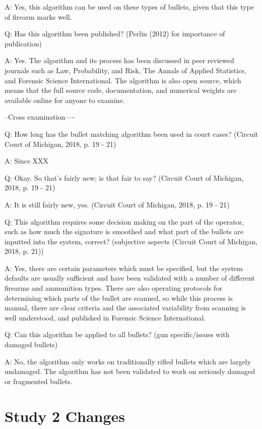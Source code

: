 \documentclass[print]{nuthesis}
\begin{document}
A: Yes, this algorithm can be used on these types of bullets, given that this type of firearm marks well.

Q: Has this algorithm been published? (Perlin (2012) for importance of publication)

A: Yes. The algorithm and its process has been discussed in peer reviewed journals such as Law, Probability, and Risk, The Annals of Applied Statistics, and Forensic Science International.
The algorithm is also open source, which means that the full source code, documentation, and numerical weights are available online for anyone to examine.

--Cross examination----

Q: How long has the bullet matching algorithm been used in court cases? (Circuit Court of Michigan, 2018, p. 19 - 21)

A: Since XXX

Q: Okay. So that's fairly new; is that fair to say? (Circuit Court of Michigan, 2018, p. 19 - 21)

A: It is still fairly new, yes. (Circuit Court of Michigan, 2018, p. 19 - 21)

Q: This algorithm requires some decision making on the part of the operator, such as how much the signature is smoothed and what part of the bullets are inputted into the system, correct? (subjective aspects (Circuit Court of Michigan, 2018, p. 21))

A: Yes, there are certain parameters which must be specified, but the system defaults are usually sufficient and have been validated with a number of different firearms and ammunition types.
There are also operating protocols for determining which parts of the bullet are scanned, so while this process is manual, there are clear criteria and the associated variability from scanning is well understood, and published in Forensic Science International.

Q: Can this algorithm be applied to all bullets? (gun specific/issues with damaged bullets)

A: No, the algorithm only works on traditionally rifled bullets which are largely undamaged.
The algorithm has not been validated to work on seriously damaged or fragmented bullets.

\hypertarget{study-2-changes}{%
\chapter{Study 2 Changes}\label{study-2-changes}}
\end{document}
